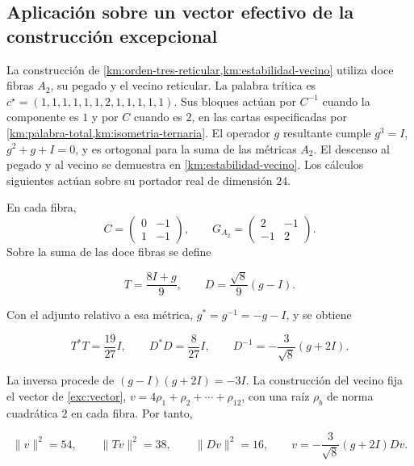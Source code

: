\subsection{Aplicación sobre un vector efectivo de la construcción excepcional}

La construcción de
\cref{km:orden-tres-reticular,km:estabilidad-vecino}
utiliza doce fibras \(A_2\), su pegado y el vecino reticular.
La palabra trítica es
\(c^\star=(1,1,1,1,1,1,2,1,1,1,1,1)\).
Sus bloques actúan por \(C^{-1}\) cuando la componente es \(1\)
y por \(C\) cuando es \(2\), en las cartas especificadas por
\cref{km:palabra-total,km:isometria-ternaria}.
El operador \(g\) resultante cumple
\(g^3=I\), \(g^2+g+I=0\), y es ortogonal para la suma de las
métricas \(A_2\).
El descenso al pegado y al vecino se demuestra en
\cref{km:estabilidad-vecino}.
Los cálculos siguientes actúan sobre su portador real de
dimensión \(24\).

En cada fibra,
\[
 C=\begin{pmatrix}0&-1\\1&-1\end{pmatrix},
 \qquad
 G_{A_2}=\begin{pmatrix}2&-1\\-1&2\end{pmatrix}.
\]
Sobre la suma de las doce fibras se define



\[
T=\frac{8I+g}{9},\qquad D=\frac{\sqrt8}{9}(g-I).
\]



Con el adjunto relativo a esa métrica,
\(g^*=g^{-1}=-g-I\), y se obtiene



\begin{equation}
T^*T=\frac{19}{27}I,
\qquad D^*D=\frac8{27}I,
\qquad D^{-1}=-\frac3{\sqrt8}(g+2I).
\label{nuc11:eq:18}
\end{equation}



La inversa procede de \((g-I)(g+2I)=-3I\).
La construcción del vecino fija el vector de
\eqref{exc:vector},
\(v=4\rho_1+\rho_2+\cdots+\rho_{12}\), con una raíz
\(\rho_b\) de norma cuadrática \(2\) en cada fibra.
Por tanto,



\begin{equation}
\|v\|^2=54,\qquad \|Tv\|^2=38,\qquad \|Dv\|^2=16,
\qquad v=-\frac3{\sqrt8}(g+2I)Dv.
\label{nuc11:eq:19}
\end{equation}




